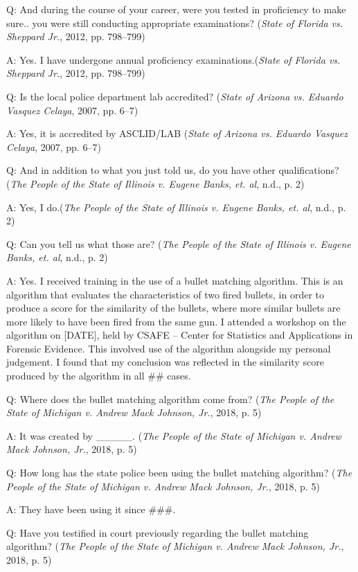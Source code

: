 \documentclass[print]{nuthesis}
\begin{document}
Q: And during the course of your career, were you tested in proficiency to make sure.. you were still conducting appropriate examinations? (\emph{State of {Florida} vs. Sheppard {Jr.}}, 2012, pp. 798--799)

A: Yes. I have undergone annual proficiency examinations.(\emph{State of {Florida} vs. Sheppard {Jr.}}, 2012, pp. 798--799)

Q: Is the local police department lab accredited? (\emph{State of {Arizona} vs. Eduardo {Vasquez} {Celaya}}, 2007, pp. 6--7)

A: Yes, it is accredited by ASCLID/LAB (\emph{State of {Arizona} vs. Eduardo {Vasquez} {Celaya}}, 2007, pp. 6--7)

Q: And in addition to what you just told us, do you have other qualifications? (\emph{The {People} of the {State} of {Illinois} v. Eugene {Banks}, et. al}, n.d., p. 2)

A: Yes, I do.(\emph{The {People} of the {State} of {Illinois} v. Eugene {Banks}, et. al}, n.d., p. 2)

Q: Can you tell us what those are? (\emph{The {People} of the {State} of {Illinois} v. Eugene {Banks}, et. al}, n.d., p. 2)

A: Yes. I received training in the use of a bullet matching algorithm.
This is an algorithm that evaluates the characteristics of two fired bullets, in order to produce a score for the similarity of the bullets, where more similar bullets are more likely to have been fired from the same gun.
I attended a workshop on the algorithm on {[}DATE{]}, held by CSAFE -- Center for Statistics and Applications in Forensic Evidence.
This involved use of the algorithm alongside my personal judgement.
I found that my conclusion was reflected in the similarity score produced by the algorithm in all \#\# cases.

Q: Where does the bullet matching algorithm come from? (\emph{The {People} of the {State} of {Michigan} v. Andrew {Mack} {Johnson}, {Jr.}}, 2018, p. 5)

A: It was created by \_\_\_\_\_. (\emph{The {People} of the {State} of {Michigan} v. Andrew {Mack} {Johnson}, {Jr.}}, 2018, p. 5)

Q: How long has the state police been using the bullet matching algorithm? (\emph{The {People} of the {State} of {Michigan} v. Andrew {Mack} {Johnson}, {Jr.}}, 2018, p. 5)

A: They have been using it since \#\#\#.

Q: Have you testified in court previously regarding the bullet matching algorithm? (\emph{The {People} of the {State} of {Michigan} v. Andrew {Mack} {Johnson}, {Jr.}}, 2018, p. 5)
\end{document}

